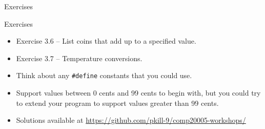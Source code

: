 \documentclass{beamer}
\begin{document}
\begin{frame}{Exercises}
    \begin{block}{Exercises}
        \begin{itemize}
            \item Exercise 3.6 -- List coins that add up to a specified value.
            \item Exercise 3.7 -- Temperature conversions.
        \end{itemize}
    \end{block}
    \begin{itemize}
        \item Think about any \texttt{\#define} constants that you could use.
        \item Support values between 0 cents and 99 cents to begin with, but
            you could try to extend your program to support values greater
            than 99 cents.
        \item Solutions available at \url{https://github.com/pkill-9/comp20005-workshops/}
    \end{itemize}
\end{frame}

%
%
%
%
% 
\end{document}
